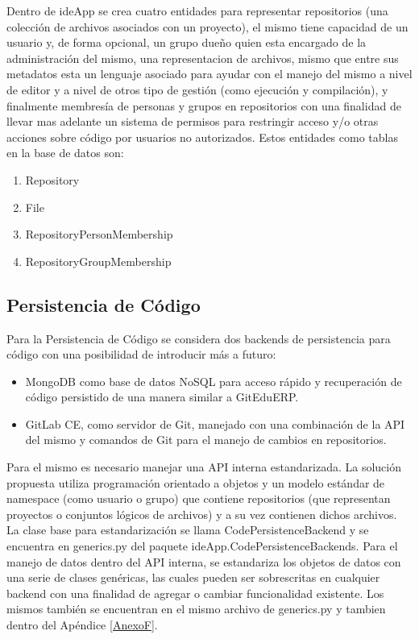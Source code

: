 Dentro de ideApp se crea cuatro entidades para representar repositorios (una colección de archivos asociados con un proyecto), el mismo tiene capacidad de un usuario y, de forma opcional, un grupo dueño quien esta encargado de la administración del mismo, una representacion de archivos, mismo que entre sus metadatos esta un lenguaje asociado para ayudar con el manejo del mismo a nivel de editor y a nivel de otros tipo de gestión (como ejecución y compilación), y finalmente membresía de personas y grupos en repositorios con una finalidad de llevar mas adelante un sistema de permisos para restringir acceso y/o otras acciones sobre código por usuarios no autorizados. Estos entidades como tablas en la base de datos son:
\begin{enumerate}
\item Repository
\item File
\item RepositoryPersonMembership
\item RepositoryGroupMembership
\end{enumerate}

\subsection{Persistencia de Código}
Para la Persistencia de Código se considera dos backends de persistencia para código con una posibilidad de introducir más a futuro:
\begin{itemize}
	\item MongoDB como base de datos NoSQL para acceso rápido y recuperación de código persistido de una manera similar a GitEduERP.
    \item GitLab CE, como servidor de Git, manejado con una combinación de la API del mismo y comandos de Git para el manejo de cambios en repositorios.
\end{itemize}

Para el mismo es necesario manejar una API interna estandarizada. La solución propuesta utiliza programación orientado a objetos y un modelo estándar de namespace (como usuario o grupo) que contiene repositorios (que representan proyectos o conjuntos lógicos de archivos) y a su vez contienen dichos archivos. La clase base para estandarización se llama CodePersistenceBackend y se encuentra en generics.py del paquete ideApp.CodePersistenceBackends. Para el manejo de datos dentro del API interna, se estandariza los objetos de datos con una serie de clases genéricas, las cuales pueden ser sobrescritas en cualquier backend con una finalidad de agregar o cambiar funcionalidad existente. Los mismos también se encuentran en el mismo archivo de generics.py y tambien dentro del Apéndice \ref{AnexoF}.

